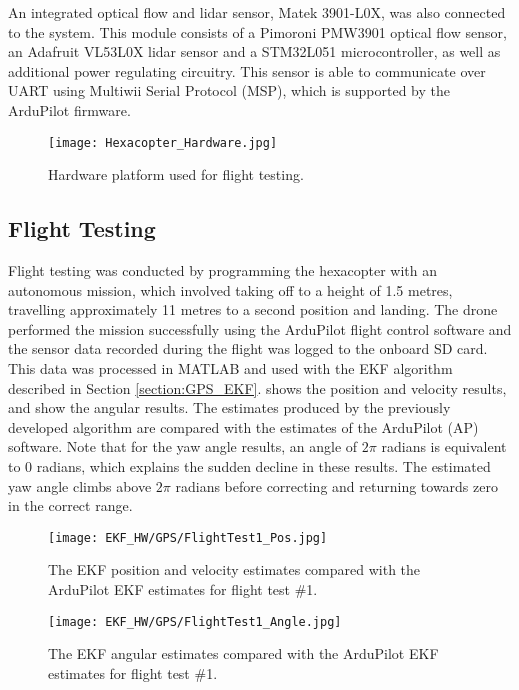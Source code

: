 An integrated optical flow and lidar sensor, Matek 3901-L0X, was also connected to the system. This module consists of a Pimoroni PMW3901 optical flow sensor, an Adafruit VL53L0X lidar sensor and a STM32L051 microcontroller, as well as additional power regulating circuitry. This sensor is able to communicate over UART using Multiwii Serial Protocol (MSP), which is supported by the ArduPilot firmware.

\begin{figure}[htb]
	\texttt{[image: Hexacopter\_Hardware.jpg]}%
	\caption{Hardware platform used for flight testing.}%
	\label{fig:hardware}%
\end{figure}

\FloatBarrier
\subsection{Flight Testing}
Flight testing was conducted by programming the hexacopter with an autonomous mission, which involved taking off to a height of 1.5 metres, travelling approximately 11 metres to a second position and landing. The drone performed the mission successfully using the ArduPilot flight control software and the sensor data recorded during the flight was logged to the onboard SD card. This data was processed in MATLAB and used with the EKF algorithm described in Section \ref{section:GPS_EKF}.  shows the position and velocity results, and  show the angular results. The estimates produced by the previously developed algorithm are compared with the estimates of the ArduPilot (AP) software. Note that for the yaw angle results, an angle of $2\pi$ radians is equivalent to 0 radians, which explains the sudden decline in these results. The estimated yaw angle climbs above $2\pi$ radians before correcting and returning towards zero in the correct range. 

\begin{figure}[htb]
	\texttt{[image: EKF\_HW/GPS/FlightTest1\_Pos.jpg]}%
	\caption{The EKF position and velocity estimates compared with the ArduPilot EKF estimates for flight test \#1.}%
	\label{fig:HW_GPS_Pos}%
\end{figure}

\begin{figure}[htb]
	\texttt{[image: EKF\_HW/GPS/FlightTest1\_Angle.jpg]}%
	\caption{The EKF angular estimates compared with the ArduPilot EKF estimates for flight test \#1.}%
	\label{fig:HW_GPS_Ang}%
\end{figure}

